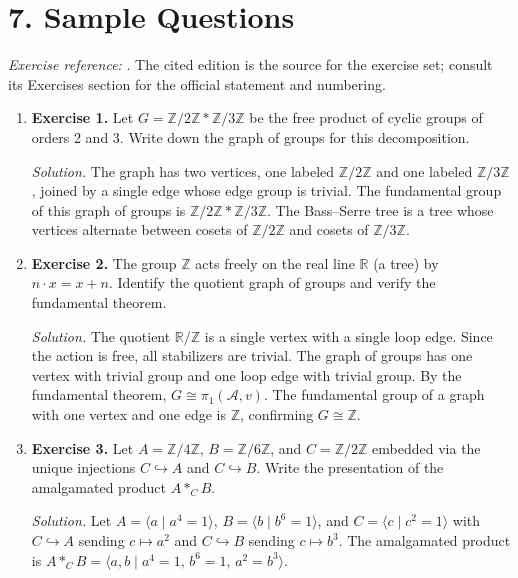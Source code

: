 \section*{7. Sample Questions}
\emph{Exercise reference:} \cite{bass_serre_theory_ref1}. The cited edition is the source for the exercise set; consult its Exercises section for the official statement and numbering.
\begin{enumerate}[leftmargin=*,itemsep=0.9em]

\item \textbf{Exercise 1.} Let $G=\mathbb{Z}/2\mathbb{Z}*\mathbb{Z}/3\mathbb{Z}$ be the free product of cyclic groups of orders 2 and 3. Write down the graph of groups for this decomposition.

\emph{Solution.} The graph has two vertices, one labeled $\mathbb{Z}/2\mathbb{Z}$ and one labeled $\mathbb{Z}/3\mathbb{Z}$, joined by a single edge whose edge group is trivial. The fundamental group of this graph of groups is $\mathbb{Z}/2\mathbb{Z}*\mathbb{Z}/3\mathbb{Z}$. The Bass--Serre tree is a tree whose vertices alternate between cosets of $\mathbb{Z}/2\mathbb{Z}$ and cosets of $\mathbb{Z}/3\mathbb{Z}$.

\item \textbf{Exercise 2.} The group $\mathbb{Z}$ acts freely on the real line $\mathbb{R}$ (a tree) by $n\cdot x=x+n$. Identify the quotient graph of groups and verify the fundamental theorem.

\emph{Solution.} The quotient $\mathbb{R}/\mathbb{Z}$ is a single vertex with a single loop edge. Since the action is free, all stabilizers are trivial. The graph of groups has one vertex with trivial group and one loop edge with trivial group. By the fundamental theorem, $G\cong\pi_1(\mathcal{A},v)$. The fundamental group of a graph with one vertex and one edge is $\mathbb{Z}$, confirming $G\cong\mathbb{Z}$.

\item \textbf{Exercise 3.} Let $A=\mathbb{Z}/4\mathbb{Z}$, $B=\mathbb{Z}/6\mathbb{Z}$, and $C=\mathbb{Z}/2\mathbb{Z}$ embedded via the unique injections $C\hookrightarrow A$ and $C\hookrightarrow B$. Write the presentation of the amalgamated product $A*_C B$.

\emph{Solution.} Let $A=\langle a\mid a^4=1\rangle$, $B=\langle b\mid b^6=1\rangle$, and $C=\langle c\mid c^2=1\rangle$ with $C\hookrightarrow A$ sending $c\mapsto a^2$ and $C\hookrightarrow B$ sending $c\mapsto b^3$. The amalgamated product is $A*_C B=\langle a,b\mid a^4=1,\,b^6=1,\,a^2=b^3\rangle$.


\end{enumerate}
